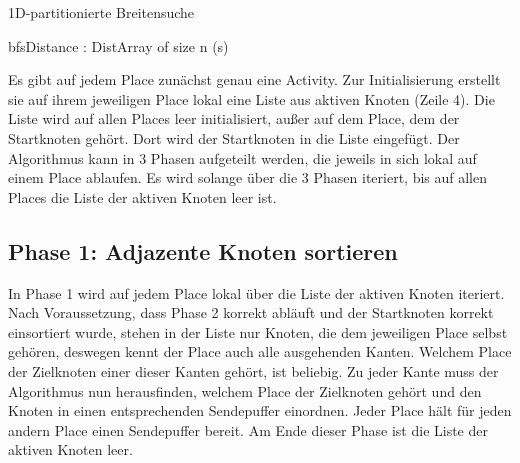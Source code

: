 \begin{algorithm}
	\caption{1D-partitionierte Breitensuche}
	\label{alg:1d_bfs_abstract}
	\begin{algorithmic}[1]
		\State bfsDistance : DistArray of size n 
			(s) 
					\EndFor
				\EndFor

					\EndIf
				\EndFor
			\EndWhile
		\EndFor
	\end{algorithmic}
\end{algorithm}

Es gibt auf jedem Place zunächst genau eine Activity. Zur Initialisierung erstellt sie auf ihrem jeweiligen Place lokal eine Liste aus aktiven Knoten (Zeile 4). Die Liste wird auf allen Places leer initialisiert, außer auf dem Place, dem der Startknoten gehört. Dort wird der Startknoten in die Liste eingefügt. Der Algorithmus kann in 3 Phasen aufgeteilt werden, die jeweils in sich lokal auf einem Place ablaufen. Es wird solange über die 3 Phasen iteriert, bis auf allen Places die Liste der aktiven Knoten leer ist.

\subsection{Phase 1: Adjazente Knoten sortieren} %
\label{sub:phase_1}
In Phase 1 wird auf jedem Place lokal über die Liste der aktiven Knoten iteriert. Nach Voraussetzung, dass Phase 2 korrekt abläuft und der Startknoten korrekt einsortiert wurde, stehen in der Liste nur Knoten, die dem jeweiligen Place selbst gehören, deswegen kennt der Place auch alle ausgehenden Kanten. Welchem Place der Zielknoten einer dieser Kanten gehört, ist beliebig. Zu jeder Kante muss der Algorithmus nun herausfinden, welchem Place der Zielknoten gehört und den Knoten in einen entsprechenden Sendepuffer einordnen. Jeder Place hält für jeden andern Place einen Sendepuffer bereit. Am Ende dieser Phase ist die Liste der aktiven Knoten leer.


